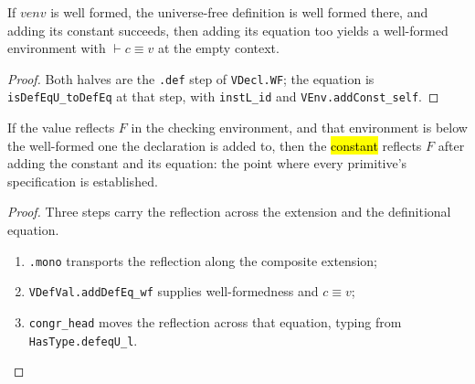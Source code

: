 \begin{theorem}
\label{vpc:thm:adddefeq-wf}\leanok
{}

 If $\mathit{venv}$ is well formed, the universe-free definition is well formed
there, and adding its constant succeeds, then adding its equation too yields a well-formed
environment with $\vdash c \equiv v$ at the empty context.
\end{theorem}
\begin{proof}\leanok
{}
 Both halves are the \texttt{.def} step of \texttt{VDecl.WF}; the equation is
\texttt{isDefEqU\_toDefEq} at that step, with \texttt{instL\_id} and
\texttt{VEnv.addConst\_self}.
\end{proof}

\begin{theorem}
\label{vpc:thm:reflects-toconst}
\leanok
{}

 If the value reflects $F$ in the checking environment, and that environment is
below the well-formed one the declaration is added to, then the \hl{constant} reflects $F$ after
adding the constant and its equation: the point where every primitive's specification is
established.
\end{theorem}
\begin{proof}\leanok
{}
 Three steps carry the reflection across the extension and the definitional equation.
\begin{enumerate}
\item \texttt{.mono} transports the reflection along the composite extension;
\item \texttt{VDefVal.addDefEq\_wf} supplies well-formedness and $c \equiv v$;
\item \texttt{congr\_head} moves the reflection across that equation, typing from
\texttt{HasType.defeqU\_l}.
\end{enumerate}
\end{proof}

